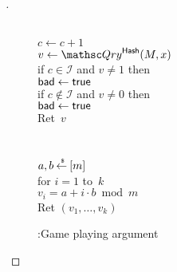 \begin{proof}[]
\begin{figure}
{{%
%
\\
$c \gets c+1$\\
$v \gets \Qry^{\HashOracle}(M,x)$\\
if $c \in \mathcal{I}$ and $v\neq 1$ then\\
\nudge $\mathsf{bad} \gets \mathsf{true}$ \\
if $c \not\in \mathcal{I}$ and $v\neq 0$ then\\
\nudge $\mathsf{bad} \gets \mathsf{true}$\\
Ret~$v$\\\\
%
\\
$a,b {\:\stackrel{{\scriptscriptstyle \hspace{0.2em}\$}} {\leftarrow}\:} [m]$\\
for $i = 1$ to~$k$\\
\nudge $v_i = a+i \cdot b \bmod m$\\
Ret $\left(v_1,\ldots,v_k\right)$
}
}
\caption{:Game playing argument}\label{fig:Game}
\end{figure}


\end{proof}
